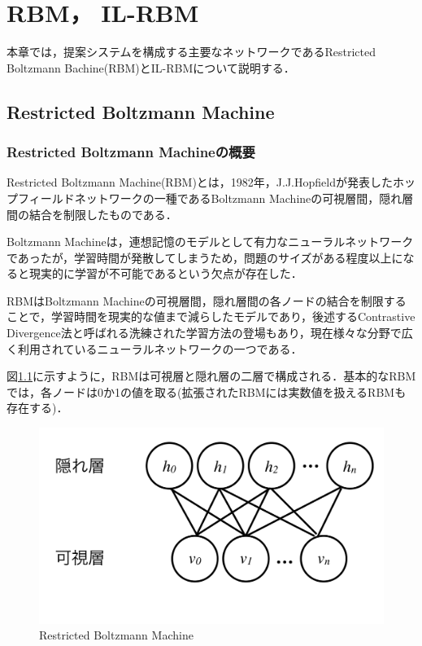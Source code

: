 \chapter{RBM， IL-RBM}
本章では，提案システムを構成する主要なネットワークであるRestricted Boltzmann Bachine(RBM)\cite{RBM1,Hinton-guide ,fischer2012introduction}とIL-RBM\cite{osawa}について説明する．

\section{Restricted Boltzmann Machine}
\subsection{Restricted Boltzmann Machineの概要}
Restricted Boltzmann Machine(RBM)とは，1982年，J.J.Hopfieldが発表した\cite{hopfield1982neural}ホップフィールドネットワークの一種であるBoltzmann Machineの可視層間，隠れ層間の結合を制限したものである．
 
Boltzmann Machineは，連想記憶のモデルとして有力なニューラルネットワークであったが，学習時間が発散してしまうため，問題のサイズがある程度以上になると現実的に学習が不可能であるという欠点が存在した．

RBMはBoltzmann Machineの可視層間，隠れ層間の各ノードの結合を制限することで，学習時間を現実的な値まで減らしたモデルであり，後述するContrastive Divergence法\cite{CD}と呼ばれる洗練された学習方法の登場もあり，現在様々な分野で広く利用されているニューラルネットワークの一つである．


図\ref{fig:rbm}に示すように，RBMは可視層と隠れ層の二層で構成される．基本的なRBMでは，各ノードは0か1の値を取る(拡張されたRBMには実数値を扱えるRBMも存在する\cite{ackley1985learning})．

\begin{figure}[tb]
 \begin{center}
  \includegraphics[scale=0.6]{./koki/rbm.png}
  \caption{Restricted Boltzmann Machine}
  \label{fig:rbm}
 \end{center}
\end{figure}

